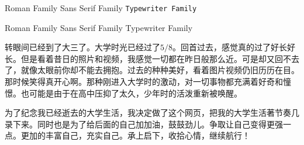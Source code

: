 \documentclass{ctexart} %
\begin{document}
	\textrm{Roman Family} \textsf{Sans Serif Family} \texttt{Typewriter Family}
	
	{\rmfamily Roman Family} {\sffamily Sans Serif Family} {\ttfamily Typewriter Family}
	
	{\ttfamily %
	转眼间已经到了大三了。大学时光已经过了$5/8$。回首过去，感觉真的过了好长好长。但是看着昔日的照片和视频，我感觉一切都在昨日般那么近。可是却又回不去了，就像太眼前你却不能去拥抱。过去的种种美好，看着图片视频仍旧历历在目。那时候笑得真开心啊。那种刚进入大学时的激动，对一切事物都充满着好奇和憧憬。也可能是由于在高中压抑了太久，少年时的活泼重新被唤醒。}
	
	{\sffamily 为了纪念我已经逝去的大学生活，我决定做了这个网页，把我的大学生活著节奏几录下来。同时也是为了给后面的自己加加油，鼓鼓劲儿。争取让自己变得更强一点。更加的丰富自己，充实自己。承上启下，收拾心情，继续航行！}
	
	
	
	
	
	
	
	
\end{document}
